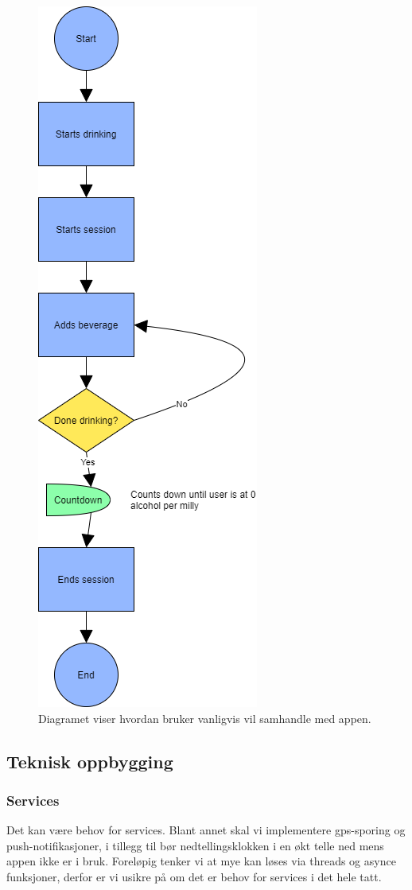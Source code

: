\begin{figure}[H]
    \centering
    \includegraphics[scale=0.4]{images/lille_promille_user_float.drawio.png}
    \caption{Diagramet viser hvordan bruker vanligvis vil samhandle med appen.}
\end{figure}

\subsection{Teknisk oppbygging}
\subsubsection{Services}
Det kan være behov for services. Blant annet skal vi implementere gps-sporing og push-notifikasjoner, i tillegg til bør nedtellingsklokken i en økt telle ned mens appen ikke er i bruk. Foreløpig tenker vi at mye kan løses via threads og asynce funksjoner, derfor er vi usikre på om det er behov for services i det hele tatt.

